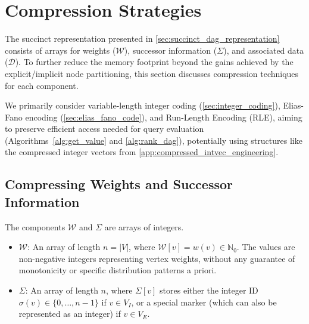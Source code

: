 \section{Compression Strategies}
\label{sec:compression_strategies}

The succinct representation presented in \autoref{sec:succinct_dag_representation} consists of arrays for weights ($\mathcal{W}$), successor information ($\Sigma$), and associated data ($\mathcal{D}$). To further reduce the memory footprint beyond the gains achieved by the explicit/implicit node partitioning, this section discusses compression techniques for each component.

We primarily consider variable-length integer coding (\autoref{sec:integer_coding}), Elias-Fano encoding (\autoref{sec:elias_fano_code}), and Run-Length Encoding (RLE), aiming to preserve efficient access needed for query evaluation (Algorithms~\ref{alg:get_value} and \ref{alg:rank_dag}), potentially using structures like the compressed integer vectors from \autoref{app:compressed_intvec_engineering}.

\subsection{Compressing Weights and Successor Information}
\label{subsec:compressing_W_Sigma}

The components $\mathcal{W}$ and $\Sigma$ are arrays of integers.
\begin{itemize}
    \item $\mathcal{W}$: An array of length $n = |V|$, where $\mathcal{W}[v] = w(v) \in \mathbb{N}_0$. The values are non-negative integers representing vertex weights, without any guarantee of monotonicity or specific distribution patterns a priori.
    \item $\Sigma$: An array of length $n$, where $\Sigma[v]$ stores either the integer ID $\sigma(v) \in \{0, \dots, n-1\}$ if $v \in V_I$, or a special marker (which can also be represented as an integer) if $v \in V_E$.
\end{itemize}



